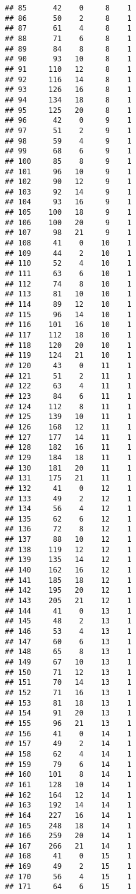 \documentclass[
]{article}
\begin{document}
\begin{verbatim}
## 85      42    0     8    1
## 86      50    2     8    1
## 87      61    4     8    1
## 88      71    6     8    1
## 89      84    8     8    1
## 90      93   10     8    1
## 91     110   12     8    1
## 92     116   14     8    1
## 93     126   16     8    1
## 94     134   18     8    1
## 95     125   20     8    1
## 96      42    0     9    1
## 97      51    2     9    1
## 98      59    4     9    1
## 99      68    6     9    1
## 100     85    8     9    1
## 101     96   10     9    1
## 102     90   12     9    1
## 103     92   14     9    1
## 104     93   16     9    1
## 105    100   18     9    1
## 106    100   20     9    1
## 107     98   21     9    1
## 108     41    0    10    1
## 109     44    2    10    1
## 110     52    4    10    1
## 111     63    6    10    1
## 112     74    8    10    1
## 113     81   10    10    1
## 114     89   12    10    1
## 115     96   14    10    1
## 116    101   16    10    1
## 117    112   18    10    1
## 118    120   20    10    1
## 119    124   21    10    1
## 120     43    0    11    1
## 121     51    2    11    1
## 122     63    4    11    1
## 123     84    6    11    1
## 124    112    8    11    1
## 125    139   10    11    1
## 126    168   12    11    1
## 127    177   14    11    1
## 128    182   16    11    1
## 129    184   18    11    1
## 130    181   20    11    1
## 131    175   21    11    1
## 132     41    0    12    1
## 133     49    2    12    1
## 134     56    4    12    1
## 135     62    6    12    1
## 136     72    8    12    1
## 137     88   10    12    1
## 138    119   12    12    1
## 139    135   14    12    1
## 140    162   16    12    1
## 141    185   18    12    1
## 142    195   20    12    1
## 143    205   21    12    1
## 144     41    0    13    1
## 145     48    2    13    1
## 146     53    4    13    1
## 147     60    6    13    1
## 148     65    8    13    1
## 149     67   10    13    1
## 150     71   12    13    1
## 151     70   14    13    1
## 152     71   16    13    1
## 153     81   18    13    1
## 154     91   20    13    1
## 155     96   21    13    1
## 156     41    0    14    1
## 157     49    2    14    1
## 158     62    4    14    1
## 159     79    6    14    1
## 160    101    8    14    1
## 161    128   10    14    1
## 162    164   12    14    1
## 163    192   14    14    1
## 164    227   16    14    1
## 165    248   18    14    1
## 166    259   20    14    1
## 167    266   21    14    1
## 168     41    0    15    1
## 169     49    2    15    1
## 170     56    4    15    1
## 171     64    6    15    1

\end{verbatim}
\end{document}
